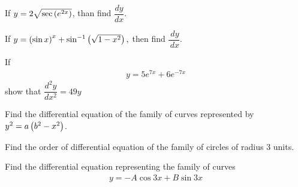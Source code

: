 \item If $y=2\sqrt{\sec\left(e^{2x}\right)}$, than find $\dfrac{dy}{dx}$.

\item If $ y=\left(\sin x\right)^x+\sin^{-1}\left(\sqrt{1-x^2}\right),$ then find $\dfrac{\, dy}{\, dx}$.  

\item If \begin{align*}y= 5e^{7x}+6e^{-7x}\end{align*} show that $\dfrac{d^2y}{dx^2}=49y$
\item Find the differential equation of the family of curves represented by $y^2=a\left(b^2-x^2\right)$.
\item Find the order of differential equation of the family of circles of radius $3$ units.

\item Find the differential equation representing the family of curves \begin{align*}y= -A\cos 3x+B\sin 3x\end{align*}

